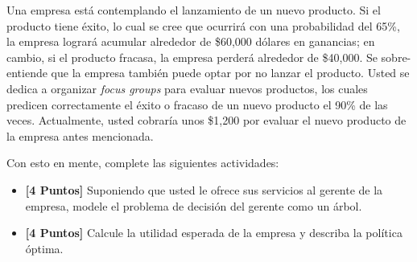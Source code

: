 \documentclass[ a4paper, twoside, 11pt]{article}
\begin{document}
\begin{problem}
Una empresa est\'a contemplando el lanzamiento de un nuevo producto. Si el producto tiene \'exito, lo cual se cree que ocurrir\'a con una probabilidad del 65\%, la empresa lograr\'a acumular alrededor de \$60,000 d\'olares en ganancias; en cambio, si el producto fracasa, la empresa perder\'a alrededor de \$40,000. Se sobre-entiende que la empresa tambi\'en puede optar por no lanzar el producto. Usted se dedica a organizar \emph{focus groups} para evaluar nuevos productos, los cuales predicen correctamente el \'exito o fracaso de un nuevo producto el 90\% de las veces. Actualmente, usted cobrar\'ia unos \$1,200 por evaluar el nuevo producto de la empresa antes mencionada. 

Con esto en mente, complete las siguientes actividades: 
\begin{itemize}
\item \textbf{[4 Puntos]} Suponiendo que usted le ofrece sus servicios al gerente de la empresa, modele el problema de decisi\'on del gerente como un \'arbol. 
\item \textbf{[4 Puntos]} Calcule la utilidad esperada de la empresa y describa la pol\'itica \'optima. 
\end{itemize}

\end{problem}
\vspace{\baselineskip}
\end{document}
